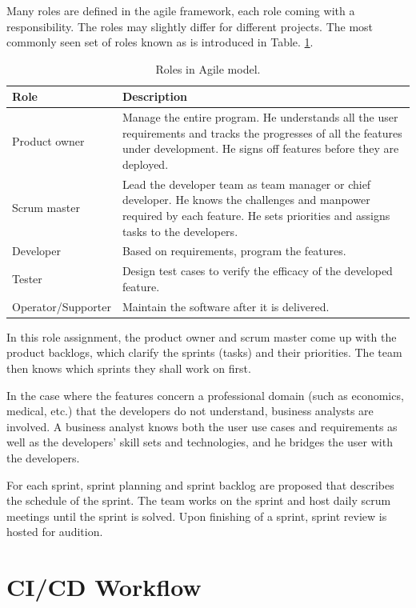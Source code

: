 Many roles are defined in the agile framework, each role coming with a responsibility. The roles may slightly differ for different projects. The most commonly seen set of roles known as  is introduced in Table. \ref{ch:cicd:tab:agilerole}.
\begin{table}[!htb]
	\centering
	\caption{Roles in Agile model.} \label{ch:cicd:tab:agilerole}
	\begin{tabularx}{\textwidth}{lX}
		\hline
		Role & Description \\
		\hline
		Product owner & Manage the entire program. He understands all the user requirements and tracks the progresses of all the features under development. He signs off features before they are deployed. \\ \hdashline
		Scrum master & Lead the developer team as team manager or chief developer. He knows the challenges and manpower required by each feature. He sets priorities and assigns tasks to the developers. \\ \hdashline
		Developer & Based on requirements, program the features. \\ \hdashline
		Tester & Design test cases to verify the efficacy of the developed feature. \\ \hdashline
		Operator/Supporter & Maintain the software after it is delivered. \\
		\hline
	\end{tabularx}
\end{table}

In this role assignment, the product owner and scrum master come up with the product backlogs, which clarify the sprints (tasks) and their priorities. The team then knows which sprints they shall work on first.

In the case where the features concern a professional domain (such as economics, medical, etc.) that the developers do not understand, business analysts are involved. A business analyst knows both the user use cases and requirements as well as the developers' skill sets and technologies, and he bridges the user with the developers.

For each sprint, sprint planning and sprint backlog are proposed that describes the schedule of the sprint. The team works on the sprint and host daily scrum meetings until the sprint is solved. Upon finishing of a sprint, sprint review is hosted for audition.

\section{CI/CD Workflow}

